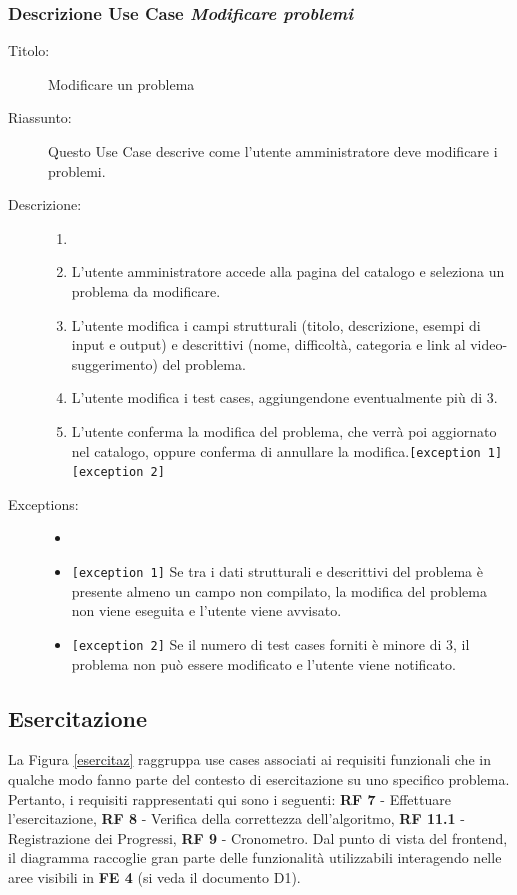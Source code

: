\documentclass[11pt, a4paper]{article}
\theoremstyle{definition} %
\begin{document}
\subsubsection*{Descrizione Use Case \textit{Modificare problemi}}
\begin{description}
    \item[Titolo:] Modificare un problema
    
    \item[Riassunto:] Questo Use Case descrive come l'utente amministratore
    deve modificare i problemi.

    \item[Descrizione:]
    \begin{enumerate}
        \item[]
        \item L'utente amministratore accede alla pagina del catalogo e seleziona un problema da modificare.
        \item L'utente modifica i campi strutturali (titolo, descrizione, esempi di input e output) e descrittivi (nome, difficoltà, categoria e link al video-suggerimento) del problema.
        \item L'utente modifica i test cases, aggiungendone eventualmente più di 3.
        \item L'utente conferma la modifica del problema, che verrà poi aggiornato nel catalogo, oppure conferma di annullare la modifica.\texttt{[exception 1]} \texttt{[exception 2]}
    \end{enumerate}
    
    \item[Exceptions:]
    \begin{itemize}
        \item[]
        \item \texttt{[exception 1]} Se tra i dati strutturali e descrittivi del problema è presente almeno un campo non compilato, la modifica del problema non viene eseguita e l'utente viene avvisato.
        \item \texttt{[exception 2]} Se il numero di test cases forniti è minore di 3, il problema non può essere modificato e l'utente viene notificato.
    \end{itemize}
\end{description}

\newpage
\subsection{Esercitazione}
La Figura \ref{esercitaz} raggruppa use cases associati ai requisiti funzionali
che in qualche modo fanno parte del contesto di esercitazione su uno specifico problema. Pertanto,
i requisiti rappresentati qui sono i seguenti: \textbf{RF 7} - Effettuare l'esercitazione,
\textbf{RF 8} - Verifica della correttezza dell'algoritmo, \textbf{RF 11.1} - Registrazione dei
Progressi, \textbf{RF 9} - Cronometro. Dal punto di vista del frontend, il diagramma
raccoglie gran parte delle funzionalità utilizzabili interagendo nelle aree
visibili in \textbf{FE 4} (si veda il documento D1).
\end{document}

